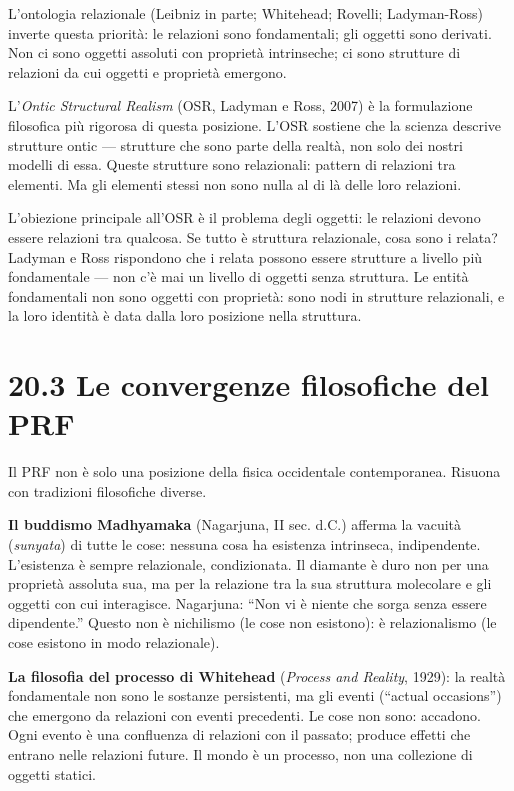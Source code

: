 \documentclass[11.5pt,a4paper,openany]{book}
\theoremstyle{remark}
\begin{document}
L'ontologia relazionale (Leibniz in parte; Whitehead; Rovelli; Ladyman-Ross) inverte questa priorità: le relazioni sono fondamentali; gli oggetti sono derivati. Non ci sono oggetti assoluti con proprietà intrinseche; ci sono strutture di relazioni da cui oggetti e proprietà emergono.

L'\textit{Ontic Structural Realism} (OSR, Ladyman e Ross, 2007) è la formulazione filosofica più rigorosa di questa posizione. L'OSR sostiene che la scienza descrive strutture ontic --- strutture che sono parte della realtà, non solo dei nostri modelli di essa. Queste strutture sono relazionali: pattern di relazioni tra elementi. Ma gli elementi stessi non sono nulla al di là delle loro relazioni.

L'obiezione principale all'OSR è il problema degli oggetti: le relazioni devono essere relazioni tra qualcosa. Se tutto è struttura relazionale, cosa sono i relata? Ladyman e Ross rispondono che i relata possono essere strutture a livello più fondamentale --- non c'è mai un livello di oggetti senza struttura. Le entità fondamentali non sono oggetti con proprietà: sono nodi in strutture relazionali, e la loro identità è data dalla loro posizione nella struttura.

\section{20.3 Le convergenze filosofiche del PRF}

Il PRF non è solo una posizione della fisica occidentale contemporanea. Risuona con tradizioni filosofiche diverse.

\textbf{Il buddismo Madhyamaka} (Nagarjuna, II sec. d.C.) afferma la vacuità (\textit{sunyata}) di tutte le cose: nessuna cosa ha esistenza intrinseca, indipendente. L'esistenza è sempre relazionale, condizionata. Il diamante è duro non per una proprietà assoluta sua, ma per la relazione tra la sua struttura molecolare e gli oggetti con cui interagisce. Nagarjuna: ``Non vi è niente che sorga senza essere dipendente.'' Questo non è nichilismo (le cose non esistono): è relazionalismo (le cose esistono in modo relazionale).

\textbf{La filosofia del processo di Whitehead} (\textit{Process and Reality}, 1929): la realtà fondamentale non sono le sostanze persistenti, ma gli eventi (``actual occasions'') che emergono da relazioni con eventi precedenti. Le cose non sono: accadono. Ogni evento è una confluenza di relazioni con il passato; produce effetti che entrano nelle relazioni future. Il mondo è un processo, non una collezione di oggetti statici.
\end{document}
